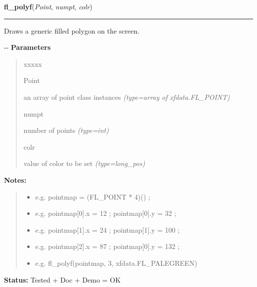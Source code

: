 \hspace{.8\funcindent}\begin{boxedminipage}{\funcwidth}

    \raggedright \textbf{fl\_polyf}(\textit{Point}, \textit{numpt}, \textit{colr})

    \vspace{-1.5ex}

    \rule{\textwidth}{0.5\fboxrule}
\setlength{\parskip}{2ex}

Draws a generic filled polygon on the screen.

-{}-
\setlength{\parskip}{1ex}
      \textbf{Parameters}
      \vspace{-1ex}

      \begin{quote}
        \begin{Ventry}{xxxxx}

          \item[Point]


an array of point class instances
            {\it (type=array of xfdata.FL\_POINT)}

          \item[numpt]


number of points
            {\it (type=int)}

          \item[colr]


value of color to be set
            {\it (type=long\_pos)}

        \end{Ventry}

      \end{quote}

\textbf{Notes:}
\begin{quote}
  \begin{itemize}

  \item
    \setlength{\parskip}{0.6ex}

e.g. pointmap = (FL\_POINT * 4)() ;


  \item 
e.g. pointmap{[}0{]}.x = 12 ; pointmap{[}0{]}.y = 32 ;


  \item 
e.g. pointmap{[}1{]}.x = 24 ; pointmap{[}1{]}.y = 100 ;


  \item 
e.g. pointmap{[}2{]}.x = 87 ; pointmap{[}0{]}.y = 132 ;


  \item 
e.g. fl\_polyf(pointmap, 3, xfdata.FL\_PALEGREEN)


\end{itemize}

\end{quote}

\textbf{Status:} 
Tested + Doc + Demo = OK


    \end{boxedminipage}

